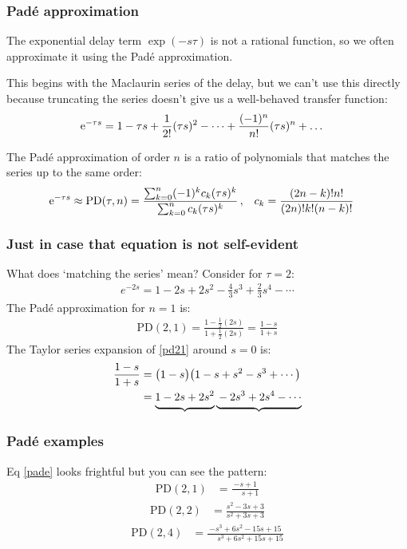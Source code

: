 \documentclass[10pt]{beamer-control}
\begin{document}
\begin{frame}
\frametitle{Padé approximation}
The exponential delay term $\exp(-s\tau)$ is not a rational function,
so we often approximate it using the \alert{Padé approximation}.

This begins with the Maclaurin series of the delay, but we can't use this directly because truncating the series doesn't give us a well-behaved transfer function:
\begin{align}
\mathrm{e}^{-\tau s} &= 1 - \tau s + \frac{1}{2!}(\tau s)^2 - \dots + \frac{(-1)^n}{n!}(\tau s)^n + \dots 
\end{align}

The Padé approximation of order $n$ is a ratio of polynomials that matches the series up to the same order:
\begin{align}\label{eq:pade}
\mathrm{e}^{-\tau s} &\approx \mathrm{PD}(\tau,n) = \frac{ \sum_{k=0}^n (-1)^k c_k (\tau s)^k  }
                            { \sum_{k=0}^n        c_k (\tau s)^k  } \,, &
          c_k &= \frac{ (2n-k)!n! }{ (2n)!k!(n-k)! }
\end{align}

\end{frame}

\begin{frame}
\frametitle{Just in case that equation is not self-evident}

What does `matching the series' mean? Consider for $\tau=2$:
\begin{align}
e^{-2s} = 1 - 2s + 2s^2 - \tfrac{4}{3}s^3 + \tfrac{2}{3}s^4 - \cdots
\end{align}
The Padé approximation for $n=1$ is:
\begin{align}\label{eq:pd21}
\mathrm{PD}(2,1) = \frac{1 - \frac{1}{2}(2s)}{1 + \frac{1}{2}(2s)} = \frac{1 - s}{1 + s}
\end{align}
The Taylor series expansion of \eqref{pd21} around $s=0$ is:
\begin{align}
\frac{1 - s}{1 + s} &= \bigl(1 - s\bigr)\bigl(1 - s + s^2 - s^3 + \cdots\bigr) \\
& = \underbrace{\strut 1 - 2s + 2s^2}  \underbrace{\strut -2s^3 + 2s^4 - \cdots}
\end{align}
\end{frame}

\begin{frame}
\frametitle{Padé examples}

Eq \eqref{pade} looks frightful but you can see the pattern:
\begin{align}
\mathrm{PD}(2,1) &= \frac{  -s + 1 }{  \phantom{+}s + 1 } 
\end{align}
\begin{align}
\mathrm{PD}(2,2) &= \frac{  s^2 - 3 s + 3 }{  s^2 + 3 s + 3 } 
\end{align}
\begin{align}
\mathrm{PD}(2,4) &= \frac{ -s^3 + 6 s^2 - 15 s + 15 }{  \phantom{+}s^3 + 6 s^2 + 15 s + 15 }
\end{align}
\end{frame}
\end{document}
